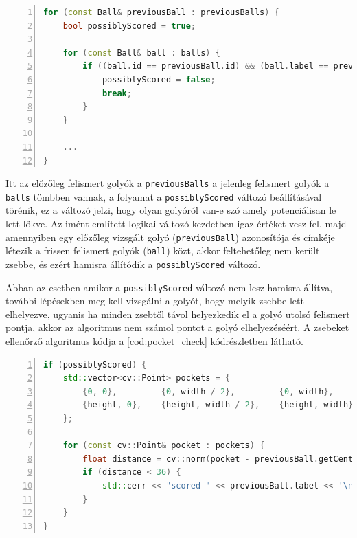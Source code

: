 \begin{codewrapper}
\begin{lstlisting}[language=C++, numbers=left, caption={Golyók potenciális lelökésének vizsgálata.}, label={cod:score_check}]
for (const Ball& previousBall : previousBalls) {
    bool possiblyScored = true;

    for (const Ball& ball : balls) {
        if ((ball.id == previousBall.id) && (ball.label == previousBall.label)) {
            possiblyScored = false;
            break;
        }
    }

    ...
}
\end{lstlisting}
\end{codewrapper}

\par Itt az előzőleg felismert golyók a \lstinline{previousBalls} a jelenleg felismert golyók a \lstinline{balls} tömbben vannak, a folyamat a \lstinline{possiblyScored} változó beállításával törénik, ez a változó jelzi, hogy olyan golyóról van-e szó amely potenciálisan le lett lökve. Az imént említett logikai változó kezdetben igaz értéket vesz fel, majd amennyiben egy előzőleg vizsgált golyó (\lstinline{previousBall}) azonosítója és címkéje létezik a frissen felismert golyók (\lstinline{ball}) közt, akkor feltehetőleg nem került zsebbe, és ezért hamisra állítódik a \lstinline{possiblyScored} változó.
\par Abban az esetben amikor a \lstinline{possiblyScored} változó nem lesz hamisra állítva, további lépésekben meg kell vizsgálni a golyót, hogy melyik zsebbe lett elhelyezve, ugyanis ha minden zsebtől távol helyezkedik el a golyó utolsó felismert pontja, akkor az algoritmus nem számol pontot a golyó elhelyezéséért. A zsebeket ellenőrző algoritmus kódja a \ref{cod:pocket_check} kódrészletben látható.

\begin{codewrapper}
\begin{lstlisting}[language=C++, numbers=left, caption={Potenciálisan lelökött golyó elhelyezett zsebének vizsgálata.}, label={cod:pocket_check}]
if (possiblyScored) {
    std::vector<cv::Point> pockets = {
        {0, 0},         {0, width / 2},         {0, width},
        {height, 0},    {height, width / 2},    {height, width}
    };

    for (const cv::Point& pocket : pockets) {
        float distance = cv::norm(pocket - previousBall.getCenter());
        if (distance < 36) {
            std::cerr << "scored " << previousBall.label << '\n';
        }
    }
}
\end{lstlisting}
\end{codewrapper}

